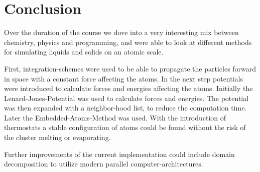 \chapter{Conclusion}
\begin{comment}
- give look at stuff i did and did not
- mention all the other cool stuff, parralell hardware memes domain decompasition looking at other mechanical parameters ia stress
- should be written nice if i wanna work with those guys
-btw the github is actually hilarious although a c++ project over 80%
- personal ?! nah
\end{comment}

Over the duration of the course we dove into a very interesting mix between chemistry, physics and programming, and were able to look at different methods for simulating liquids and solids on an atomic scale.
\par 
First, integration-schemes were used to be able to propagate the particles forward in space with a constant force affecting the atoms. In the next step potentials were introduced to calculate forces and energies affecting the atoms. Initially the Lenard-Jones-Potential was used to calculate forces and energies. The potential was then expanded with a neighbor-hood list, to reduce the computation time. Later the Embedded-Atoms-Method was used. With the introduction of thermostats a stable configuration of atoms could be found without the risk of the cluster melting or evaporating. 
\par
Further improvements of the current implementation could include domain decomposition to utilize modern parallel computer-architectures.
